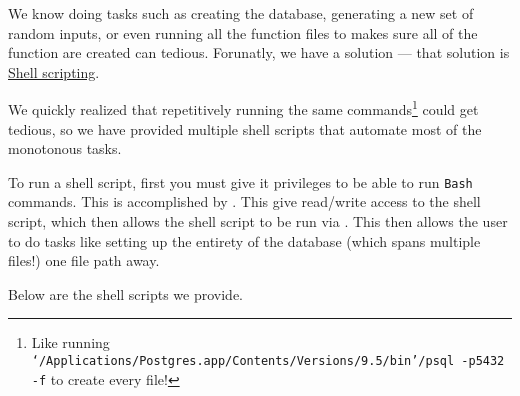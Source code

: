 We know doing tasks such as creating the database, generating a new set of random inputs, or even running all the function files to makes sure all of the function are created can tedious. Forunatly, we have a solution --- that solution is \href{http://www.freeos.com/guides/lsst/}{Shell scripting}.

We quickly realized that repetitively running the same commands\footnote{Like running \texttt{`/Applications/Postgres.app/Contents/Versions/9.5/bin'/psql -p5432 -f} to create every file!} could get tedious, so we have provided multiple shell scripts that automate most of the monotonous tasks.

To run a shell script, first you must give it privileges to be able to run \texttt{Bash} commands. This is accomplished by . This give read/write access to the shell script, which then allows the shell script to be run via . This then allows the user to do tasks like setting up the entirety of the database (which spans multiple files!) one file path away.

Below are the shell scripts we provide.